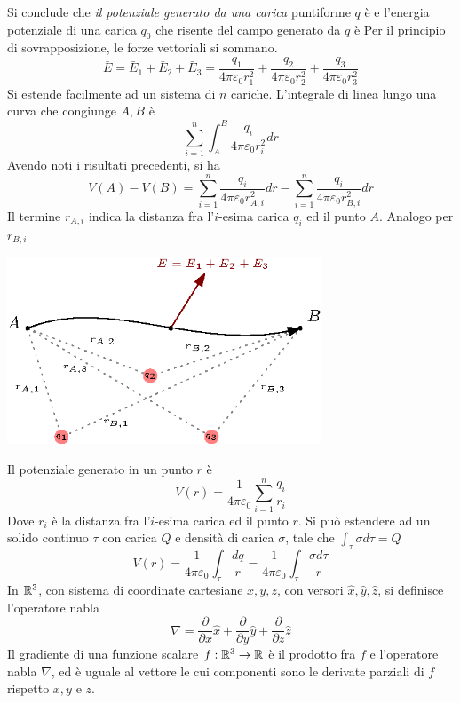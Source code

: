 \documentclass[10pt, letterpaper]{report}
\begin{document}
Si conclude che \textit{il potenziale generato da una carica} puntiforme $q$ è 
e l'energia potenziale di una carica $q_0$ che risente del campo generato da $q$ è 
Per il principio di sovrapposizione, le forze vettoriali si sommano. 
$$ \bar E = \bar E_1+\bar E_2 +\bar E_3 =\frac{q_1}{4\pi\varepsilon_0r_1^2}+ 
\frac{q_2}{4\pi\varepsilon_0r_2^2} + 
\frac{q_3}{4\pi\varepsilon_0r_3^2}$$
Si estende facilmente ad un sistema di $n$ cariche. L'integrale di linea lungo una curva che congiunge $A,B$ è 
$$\sum_{i=1}^n\int_A^B  \frac{q_i}{4\pi\varepsilon_0r_i^2}dr$$ 
Avendo noti i risultati precedenti, si ha  
$$ V(A)-V(B)=\sum_{i=1}^n \frac{q_i}{4\pi\varepsilon_0r_{A,i}^2}dr-\sum_{i=1}^n \frac{q_i}{4\pi\varepsilon_0r_{B,i}^2}dr$$
Il termine $r_{A,i}$ indica la distanza fra l'$i$-esima carica $q_i$ ed il punto $A$. Analogo per $r_{B,i}$
\begin{center}
    \includegraphics[width=0.7\textwidth]{images/sistemaCariche.eps}
\end{center}
Il potenziale generato in un punto $r$ è 
$$ V(r)=\frac{1}{4\pi\varepsilon_0}\sum_{i=1}^n\frac{q_i}{r_i}$$
Dove $r_i$ è la distanza fra l'$i$-esima carica ed il punto $r$. Si può estendere ad un solido continuo $\tau$ con carica $Q$ e  densità di carica $\sigma$, tale che $\int_{\tau}\sigma d\tau=Q$
$$ V(r)=\frac{1}{4\pi\varepsilon_0}\int_{\tau}\frac{dq}{r}=\frac{1}{4\pi\varepsilon_0}\int_{\tau}\frac{\sigma d\tau}{r}$$
 In ${\mathbb R}^3$, con sistema di coordinate cartesiane $x,y,z$, con versori  $\hat x,\hat y,\hat z$, si definisce l'operatore nabla 
$$ \nabla = \dfrac{\partial}{\partial x}\hat x+\dfrac{\partial}{\partial y}\hat y+\dfrac{\partial}{\partial z}\hat z$$
 Il gradiente di una funzione scalare $f:{\mathbb R}^3\rightarrow {\mathbb R}$ è il prodotto fra $f$ e l'operatore nabla $\nabla$, ed è uguale al vettore le cui componenti sono le derivate parziali di $f$ rispetto $x,y$ e $z$. 
\end{document}
